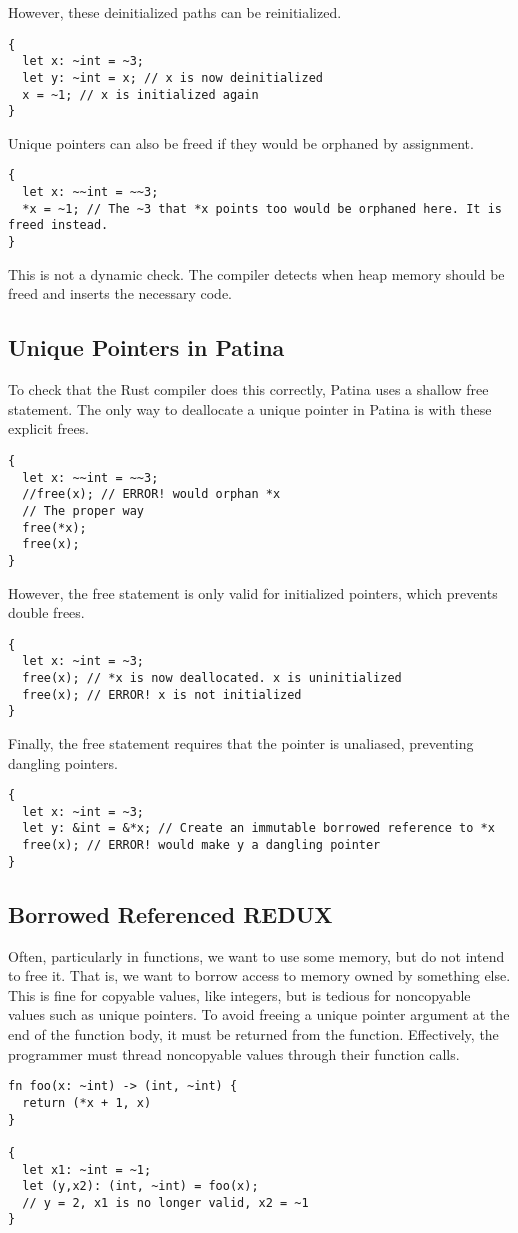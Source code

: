 However, these deinitialized paths can be reinitialized.
\begin{verbatim}
{
  let x: ~int = ~3;
  let y: ~int = x; // x is now deinitialized
  x = ~1; // x is initialized again
}
\end{verbatim}

Unique pointers can also be freed if they would be orphaned by assignment.
\begin{verbatim}
{
  let x: ~~int = ~~3;
  *x = ~1; // The ~3 that *x points too would be orphaned here. It is freed instead.
}
\end{verbatim}

This is not a dynamic check. 
The compiler detects when heap memory should be freed and inserts the necessary code.

\subsection*{Unique Pointers in Patina}
To check that the Rust compiler does this correctly, Patina uses a shallow free statement.
The only way to deallocate a unique pointer in Patina is with these explicit frees.
\begin{verbatim}
{
  let x: ~~int = ~~3;
  //free(x); // ERROR! would orphan *x
  // The proper way
  free(*x);
  free(x);
}
\end{verbatim}
However, the free statement is only valid for initialized pointers, which prevents double frees.
\begin{verbatim}
{
  let x: ~int = ~3;
  free(x); // *x is now deallocated. x is uninitialized
  free(x); // ERROR! x is not initialized
}
\end{verbatim}
Finally, the free statement requires that the pointer is unaliased, preventing dangling pointers.
\begin{verbatim}
{
  let x: ~int = ~3;
  let y: &int = &*x; // Create an immutable borrowed reference to *x
  free(x); // ERROR! would make y a dangling pointer
}
\end{verbatim}

\subsection*{Borrowed Referenced REDUX}
Often, particularly in functions, we want to use some memory, but do not intend to free it.
That is, we want to borrow access to memory owned by something else.
This is fine for copyable values, like integers, 
but is tedious for noncopyable values such as unique pointers.
To avoid freeing a unique pointer argument at the end of the function body,
it must be returned from the function.
Effectively, the programmer must thread noncopyable values through their function calls.
\begin{verbatim}
fn foo(x: ~int) -> (int, ~int) {
  return (*x + 1, x)
}

{
  let x1: ~int = ~1;
  let (y,x2): (int, ~int) = foo(x);
  // y = 2, x1 is no longer valid, x2 = ~1
}
\end{verbatim}

